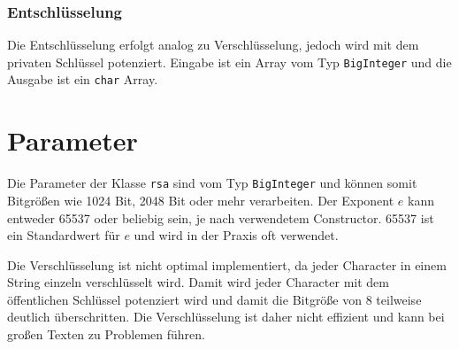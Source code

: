 \subsubsection{Entschlüsselung}
Die Entschlüsselung erfolgt analog zu Verschlüsselung, jedoch wird mit dem privaten Schlüssel potenziert. Eingabe ist ein Array vom Typ \texttt{BigInteger} und die Ausgabe ist ein \texttt{char} Array.

\section{Parameter}
Die Parameter der Klasse \texttt{\gls{rsa}} sind vom Typ \texttt{BigInteger} und können somit Bitgrößen wie 1024 Bit, 2048 Bit oder mehr verarbeiten. Der Exponent $e$ kann entweder 65537 oder beliebig sein, je nach verwendetem Constructor. 65537 ist ein Standardwert für $e$ und wird in der Praxis oft verwendet.

Die Verschlüsselung ist nicht optimal implementiert, da jeder Character in einem String einzeln verschlüsselt wird. Damit wird jeder Character mit dem öffentlichen Schlüssel potenziert wird und damit die Bitgröße von 8 teilweise deutlich überschritten. Die Verschlüsselung ist daher nicht effizient und kann bei großen Texten zu Problemen führen.